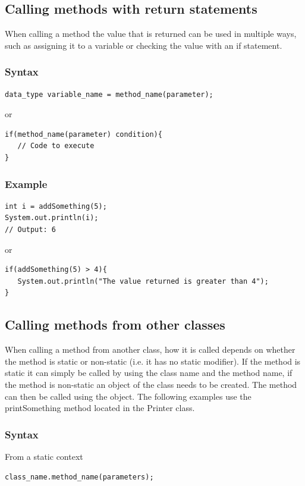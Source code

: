 \documentclass[a4paper]{article}
\begin{document}
\subsection*{Calling methods with return statements}
When calling a method the value that is returned can be used in multiple ways, such as assigning it to a variable or checking the value with an if statement.

\subsubsection*{Syntax}
\begin{lstlisting}
data_type variable_name = method_name(parameter);
\end{lstlisting}

or

\begin{lstlisting}
if(method_name(parameter) condition){
   // Code to execute
}
\end{lstlisting}


\subsubsection*{Example}
\begin{lstlisting}
int i = addSomething(5);
System.out.println(i);
// Output: 6
\end{lstlisting}

or

\begin{lstlisting}
if(addSomething(5) > 4){
   System.out.println("The value returned is greater than 4");
}
\end{lstlisting}

\subsection*{Calling methods from other classes}
When calling a method from another class, how it is called depends on whether the method is static or non-static (i.e. it has no static modifier). If the method is static it can simply be called by using the class name and the method name, if the method is non-static an object of the class needs to be created. The method can then be called using the object. The following examples use the printSomething method located in the Printer class.

\subsubsection*{Syntax}
From a static context
\begin{lstlisting}
class_name.method_name(parameters);
\end{lstlisting}
\end{document}
